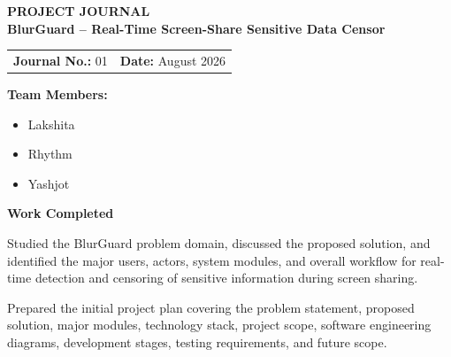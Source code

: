 \documentclass[12pt,a4paper]{article}
\begin{document}

\begin{center}
    {\Large \textbf{PROJECT JOURNAL}}\\[10pt]

    {\large \textbf{BlurGuard -- Real-Time Screen-Share Sensitive Data Censor}}
\end{center}

\vspace{10pt}


\begin{tabular}{@{}p{}p{}@{}}
\textbf{Journal No.:} 01 &
\raggedleft \textbf{Date:} August 2026
\end{tabular}

\vspace{12pt}


\textbf{Team Members:}

\begin{itemize}[leftmargin=1.5cm]
    \item Lakshita
    \item Rhythm
    \item Yashjot
\end{itemize}

\vspace{5pt}


\textbf{\large Work Completed}

\vspace{4pt}

Studied the BlurGuard problem domain, discussed the proposed solution, and
identified the major users, actors, system modules, and overall workflow for
real-time detection and censoring of sensitive information during screen
sharing.

Prepared the initial project plan covering the problem statement, proposed
solution, major modules, technology stack, project scope, software engineering
diagrams, development stages, testing requirements, and future scope.
\end{document}
